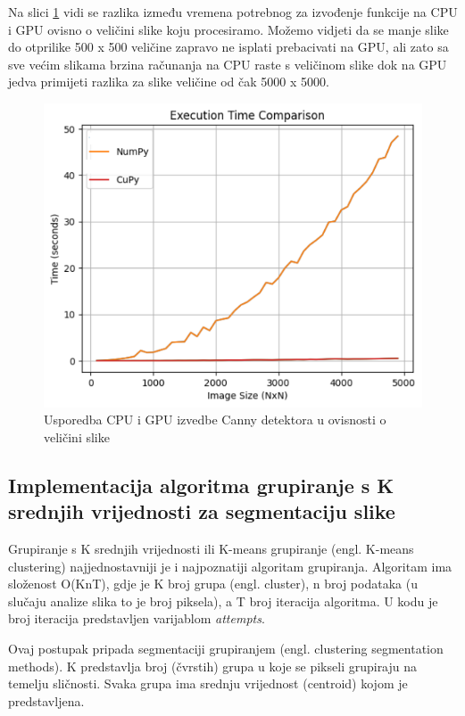 \documentclass[a4paper,twocolumn]{article}
\begin{document}
	Na slici \ref{fig:canny_timing} vidi se razlika između vremena potrebnog za izvođenje funkcije na CPU i GPU ovisno o veličini slike koju procesiramo. Možemo vidjeti da se manje slike do otprilike 500 x 500 veličine zapravo ne isplati prebacivati na GPU, ali zato sa sve većim slikama brzina računanja na CPU raste s veličinom slike dok na GPU jedva primijeti razlika za slike veličine od čak 5000 x 5000.
	
	\begin{figure}[H]
		\centering
		\includegraphics[width=1\linewidth]{slike/canny_timing.png} 
		\caption{Usporedba CPU i GPU izvedbe Canny detektora u ovisnosti o veličini slike}
		\label{fig:canny_timing}
	\end{figure}
        
 

        \subsection{Implementacija algoritma grupiranje s K srednjih vrijednosti za segmentaciju slike}
        
        Grupiranje s K srednjih vrijednosti ili K-means grupiranje (engl. K-means clustering) najjednostavniji je i najpoznatiji algoritam grupiranja. Algoritam ima složenost O(KnT), gdje je K broj grupa (engl. cluster), n broj podataka (u slučaju analize slika to je broj piksela), a T broj iteracija algoritma. U kodu je broj iteracija predstavljen varijablom \textit{attempts}.
        
        Ovaj postupak pripada segmentaciji grupiranjem (engl. clustering segmentation methods). K predstavlja broj (čvrstih) grupa u koje se pikseli grupiraju na temelju sličnosti. Svaka grupa ima srednju vrijednost (centroid) kojom je predstavljena.
        
\end{document}
